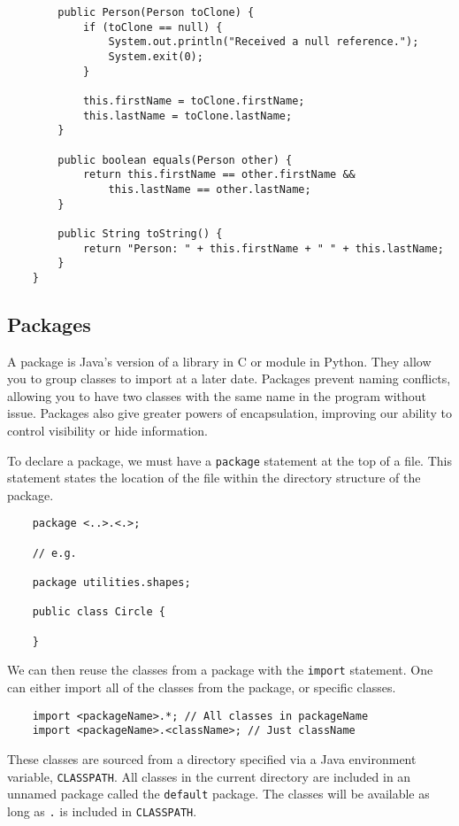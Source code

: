 \documentclass[12pt]{report}
\newcommand{\code}[1]{\lstinline{#1}}
\begin{document}
\begin{flushleft}
\begin{lstlisting}
        public Person(Person toClone) {
            if (toClone == null) {
                System.out.println("Received a null reference.");
                System.exit(0);
            }

            this.firstName = toClone.firstName;
            this.lastName = toClone.lastName;
        }

        public boolean equals(Person other) {
            return this.firstName == other.firstName &&
                this.lastName == other.lastName; 
        }

        public String toString() {
            return "Person: " + this.firstName + " " + this.lastName;
        }
    }
\end{lstlisting}

\subsection*{Packages}

A package is Java's version of a library in C or module in Python. They allow
you to group classes to import at a later date. Packages prevent naming 
conflicts, allowing you to have two classes with the same name in the program
without issue. Packages also give greater powers of encapsulation, improving
our ability to control visibility or hide information.

\bigskip
To declare a package, we must have a \code{package} statement at  the top of
a file. This statement states the location of the file within the directory
structure of the package.

\begin{lstlisting}
    package <..>.<.>;

    // e.g.

    package utilities.shapes;

    public class Circle {

    }
\end{lstlisting}

We can then reuse the classes from a package with the \code{import} statement.
One can either import all of the classes from the package, or specific classes.

\begin{lstlisting}
    import <packageName>.*; // All classes in packageName
    import <packageName>.<className>; // Just className
\end{lstlisting}

These classes are sourced from a directory specified via a Java environment 
variable, \code{CLASSPATH}. All classes in the current directory are included
in an unnamed package called the \code{default} package. The classes will be
available as long as \code{.} is included in \code{CLASSPATH}.


\end{flushleft}
\end{document}
